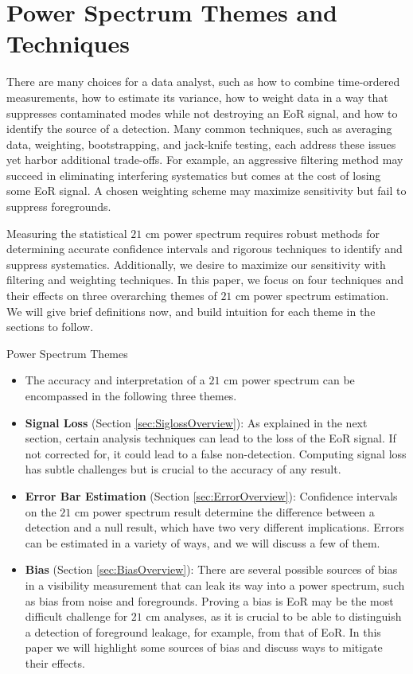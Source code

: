 \documentclass[preprint2,numberedappendix,tighten,twocolappendix]{aastex6}  %
\begin{document}
\section{Power Spectrum Themes and Techniques}
\label{sec:Themes}

There are many choices for a data analyst, such as how to combine time-ordered measurements, how to estimate its variance, how to weight data in a way that suppresses contaminated modes while not destroying an EoR signal, and how to identify the source of a detection. Many common techniques, such as averaging data, weighting, bootstrapping, and jack-knife testing, each address these issues yet harbor additional trade-offs. For example, an aggressive filtering method may succeed in eliminating interfering systematics but comes at the cost of losing some EoR signal. A chosen weighting scheme may maximize sensitivity but fail to suppress foregrounds.

Measuring the statistical $21$ cm power spectrum requires robust methods for determining accurate confidence intervals and rigorous techniques to identify and suppress systematics. Additionally, we desire to maximize our sensitivity with filtering and weighting techniques. In this paper, we focus on four techniques and their effects on three overarching themes of $21$ cm power spectrum estimation. We will give brief definitions now, and build intuition for each theme in the sections to follow.

\begin{center}
Power Spectrum Themes
\end{center}
\begin{itemize}
\item[] The accuracy and interpretation of a $21$ cm power spectrum can be encompassed in the following three themes.
\item \textbf{Signal Loss} (Section \ref{sec:SiglossOverview}): As explained in the next section, certain analysis techniques can lead to the loss of the EoR signal. If not corrected for, it could lead to a false non-detection. Computing signal loss has subtle challenges but is crucial to the accuracy of any result.
\item \textbf{Error Bar Estimation} (Section \ref{sec:ErrorOverview}): Confidence intervals on the $21$ cm power spectrum result determine the difference between a detection and a null result, which have two very different implications. Errors can be estimated in a variety of ways, and we will discuss a few of them.
\item \textbf{Bias} (Section \ref{sec:BiasOverview}): There are several possible sources of bias in a visibility measurement that can leak its way into a power spectrum, such as bias from noise and foregrounds. Proving a bias is EoR may be the most difficult challenge for $21$ cm analyses, as it is crucial to be able to distinguish a detection of foreground leakage, for example, from that of EoR. In this paper we will highlight some sources of bias and discuss ways to mitigate their effects.
\end{itemize}
\end{document}
